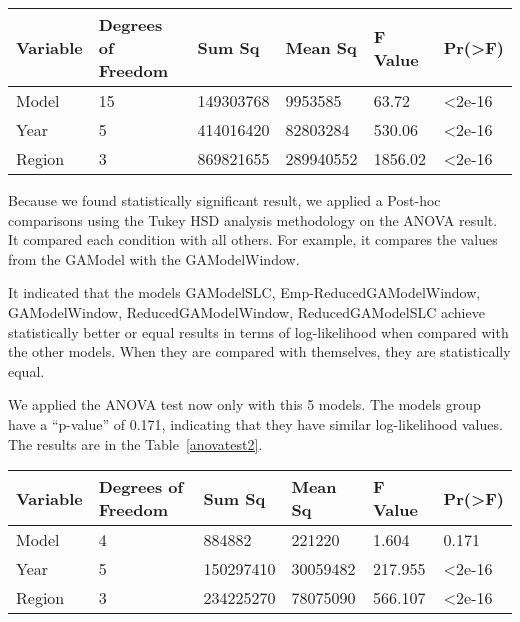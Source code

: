 \begin{table*}[]
  \centering
  \begin{tabular}{|l|l|l|l|l|l|}
    \hline
	{Variable} & {Degrees of Freedom} & {Sum Sq}    & {Mean Sq}   & {F Value} & {Pr(\textgreater F)} \\
	\hline
	Model    & 15           	  & 149303768  & 9953585   & 63.72    & \textless2e-16     \\
	\hline
	Year     & 5                  & 414016420  & 82803284  & 530.06   & \textless2e-16     \\
	\hline
	Region   & 3                  & 869821655  & 289940552  & 1856.02   & \textless2e-16	\\    
	\hline
  \end{tabular}
  \caption{ANOVA Test Results Values - Mainshock Models Mainshock and Aftershock Models.}
  \label{anovatest1}
\end{table*}

Because we found statistically significant result, we applied a
Post-hoc comparisons using the Tukey HSD analysis methodology on the
ANOVA result. It compared each condition with all others. For example,
it compares the values from the GAModel with the GAModelWindow.

It indicated that the models GAModelSLC, Emp-ReducedGAModelWindow,
GAModelWindow, ReducedGAModelWindow, ReducedGAModelSLC achieve
statistically better or equal results in terms of log-likelihood when
compared with the other models. When they are compared with
themselves, they are statistically equal.

We applied the ANOVA test now only with this 5 models. The models
group have a ``p-value'' of 0.171, indicating that they have similar
log-likelihood values. The results are in the Table~\ref{anovatest2}.
     
\begin{table*}[]
  \centering
  \begin{tabular}{|l|l|l|l|l|l|}
    \hline
	{Variable} & {Degrees of Freedom} & {Sum Sq}    & {Mean Sq}   & {F Value} & {Pr(\textgreater F)} \\
	\hline
	Model    & 4           	  & 884882  & 221220   & 1.604    & 0.171    \\
	\hline
	Year     & 5                 & 150297410  & 30059482  & 217.955   & \textless2e-16     \\
	\hline
	Region   & 3                  & 234225270  & 78075090  & 566.107   & \textless2e-16	\\    
	\hline
  \end{tabular}
  \caption{ANOVA Test Results Values - Emp-ReducedGAModelWindow, GAModelWindow, ReducedGAModelWindow, GAModelSLC, ReducedGAModelSLC.}
  \label{anovatest2}
\end{table*}

